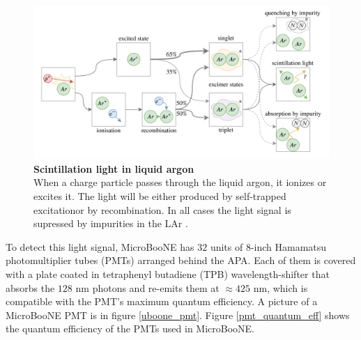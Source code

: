 \begin{figure}[h!]
    \begin{center}
        \includegraphics[scale=0.35]{Figures/lar_excimers.png}
        \caption[Scintillation light in liquid argon]{{\textbf{Scintillation light in liquid argon}} \\When a charge particle passes through the liquid argon, it ionizes or excites it. The light will be either produced by self-trapped excitationor by recombination. In all cases the light signal is supressed by impurities in the LAr \cite{lar_excimers}.}
        \label{lar_excimers} 
    \end{center}
\end{figure}
  
To detect this light signal, MicroBooNE has $32$ units of 8-inch Hamamatsu photomultiplier tubes (PMTs) arranged behind the APA. Each of them is covered with a plate coated in tetraphenyl butadiene (TPB) wavelength-shifter that absorbs the $128$ nm photons and re-emits them at $\approx425$ nm, which is compatible with the PMT's maximum quantum efficiency. A picture of a MicroBooNE PMT is in figure \ref{uboone_pmt}. Figure \ref{pmt_quantum_eff} shows the quantum efficiency of the PMTs used in MicroBooNE. 
  
